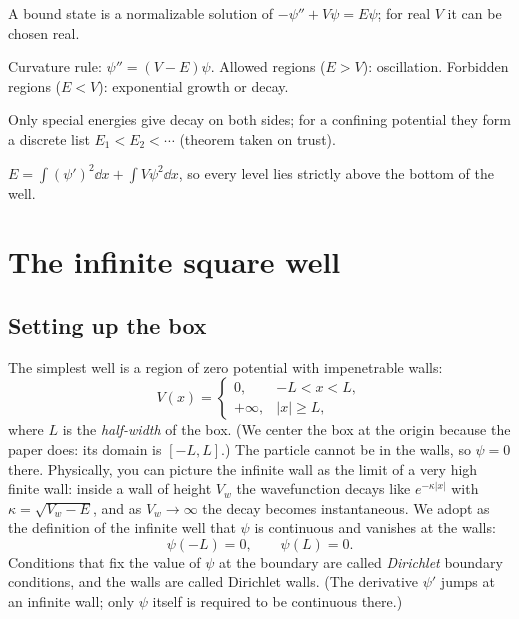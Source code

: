 \begin{keyideas}
\item A bound state is a normalizable solution of $-\psi''+V\psi=E\psi$; for real $V$ it can be chosen real.
\item Curvature rule: $\psi''=(V-E)\psi$. Allowed regions ($E>V$): oscillation. Forbidden regions ($E<V$): exponential growth or decay.
\item Only special energies give decay on both sides; for a confining potential they form a discrete list $E_1<E_2<\cdots$ (theorem taken on trust).
\item $E=\int(\psi')^2\dd x+\int V\psi^2\dd x$, so every level lies strictly above the bottom of the well.
\end{keyideas}

\section{The infinite square well}\label{sec:bound-states-box}

\subsection{Setting up the box}

The simplest well is a region of zero potential with impenetrable walls:
\begin{equation}
V(x)=\begin{cases}0, & -L<x<L,\\ +\infty, & |x|\ge L,\end{cases}
\label{eq:bound-states-boxV}
\end{equation}
where $L$ is the \emph{half-width} of the box. (We center the box at the origin because the paper does: its domain is $[-L,L]$.) The particle cannot be in the walls, so $\psi=0$ there. Physically, you can picture the infinite wall as the limit of a very high finite wall: inside a wall of height $V_w$ the wavefunction decays like $e^{-\kappa|x|}$ with $\kappa=\sqrt{V_w-E}$, and as $V_w\to\infty$ the decay becomes instantaneous. We adopt as the definition of the infinite well that $\psi$ is continuous and vanishes at the walls:
\begin{equation}
\psi(-L)=0,\qquad \psi(L)=0.
\label{eq:bound-states-dirichlet}
\end{equation}
Conditions that fix the value of $\psi$ at the boundary are called \emph{Dirichlet} boundary conditions, and the walls are called Dirichlet walls. (The derivative $\psi'$ jumps at an infinite wall; only $\psi$ itself is required to be continuous there.)

